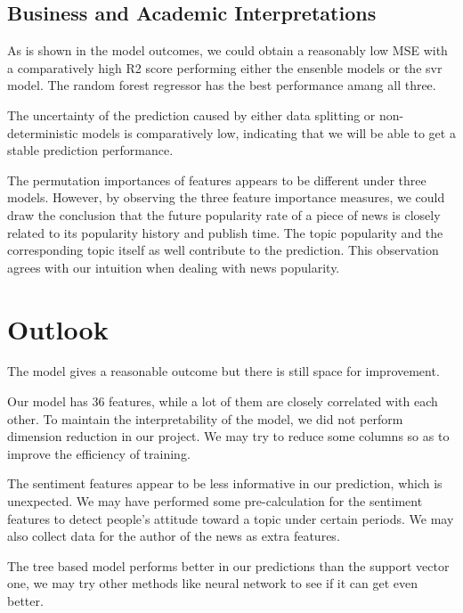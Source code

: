 \documentclass{article}
\begin{document}
\subsection{Business and Academic Interpretations}

As is shown in the model outcomes, we could obtain a reasonably low MSE with a comparatively high R2 score performing either the ensenble models or the svr model. The random forest regressor has the best performance amang all three.\par
The uncertainty of the prediction caused by either data splitting or non-deterministic models is comparatively low, indicating that we will be able to get a stable prediction performance.\par
The permutation importances of features appears to be different under three models. However, by observing the three feature importance measures, we could draw the conclusion that the future popularity rate of a piece of news is closely related to its popularity history and publish time. The topic popularity and the corresponding topic itself as well contribute to the prediction. This observation agrees with our intuition when dealing with news popularity.

\section{Outlook}

The model gives a reasonable outcome but there is still space for improvement.\par
Our model has 36 features, while a lot of them are closely correlated with each other. To maintain the interpretability of the model, we did not perform dimension reduction in our project. We may try to reduce some columns so as to improve the efficiency of training.\par
The sentiment features appear to be less informative in our prediction, which is unexpected. We may have performed some pre-calculation for the sentiment features to detect people's attitude toward a topic under certain periods. We may also collect data for the author of the news as extra features.\par
The tree based model performs better in our predictions than the support vector one, we may try other methods like neural network to see if it can get even better.
\end{document}
